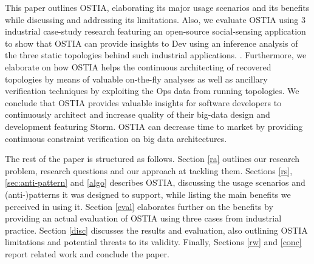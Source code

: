 This paper outlines OSTIA, elaborating its major usage scenarios and its benefits while discussing and addressing its limitations. Also, we evaluate OSTIA using 3 industrial case-study research featuring an open-source social-sensing application to show that OSTIA can provide insights to Dev using an inference analysis of the three static topologies behind such industrial applications. . Furthermore, we elaborate on how OSTIA helps the continuous architecting of recovered topologies by means of valuable on-the-fly analyses as well as ancillary verification techniques by exploiting the Ops data from running topologies. We conclude that OSTIA provides valuable insights for software developers to continuously architect and increase quality of their big-data design and development featuring Storm. OSTIA can decrease time to market by providing continuous constraint verification on big data architectures.

The rest of the paper is structured as follows. Section \ref{ra} outlines our research problem, research questions and our approach at tackling them. Sections \ref{rs}, \ref{sec:anti-pattern} and \ref{algo} describes OSTIA, discussing the usage scenarios and (anti-)patterns it was designed to support, while listing the main benefits we perceived in using it. Section \ref{eval} elaborates further on the benefits by providing an actual evaluation of OSTIA using three cases from industrial practice. Section \ref{disc} discusses the results and evaluation, also outlining OSTIA limitations and potential threats to its validity. Finally, Sections \ref{rw} and \ref{conc} report related work and conclude the paper.
